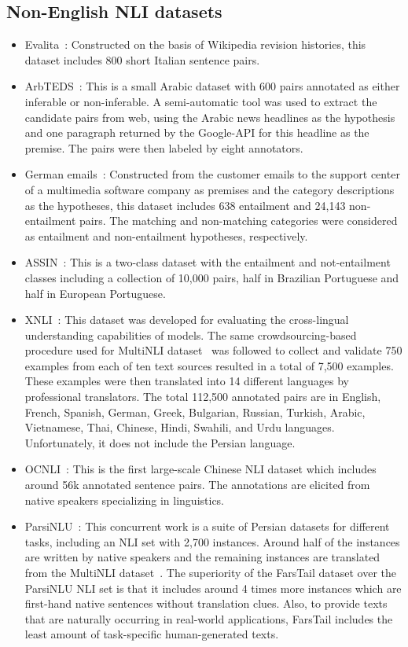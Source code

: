 \documentclass[preprint,12pt]{elsarticle}
\begin{document}
\subsection{Non-English NLI datasets}
\begin{itemize}
    \item Evalita~\citep{bos2009textual}: Constructed on the basis of Wikipedia revision histories, this dataset includes 800 short Italian sentence pairs.
    \item ArbTEDS~\citep{alabbas2013dataset}: This is a small Arabic dataset with 600 pairs annotated as either inferable or non-inferable. A semi-automatic tool was used to extract the candidate pairs from web, using the Arabic news headlines as the hypothesis and one paragraph returned by the Google-API for this headline as the premise. The pairs were then labeled by eight annotators. 
    \item German emails~\citep{eichler2014analysis}:  Constructed from the customer emails to the support center of a multimedia software company as premises and the category descriptions as the hypotheses, this dataset includes 638 entailment and 24,143 non-entailment pairs.  The matching and non-matching categories were considered as entailment and non-entailment hypotheses, respectively. 
    \item ASSIN~\citep{fonseca2016overview}: This is a two-class dataset with the entailment and not-entailment classes including a collection of 10,000 pairs, half in Brazilian Portuguese and half in European Portuguese. 
    \item XNLI~\citep{conneau2018xnli}: This dataset was developed for evaluating the cross-lingual understanding capabilities of models. The same crowdsourcing-based procedure used for MultiNLI dataset~\citep{williams2017broad} was followed to collect and validate 750 examples from each of ten text sources resulted in a total of 7,500 examples. These examples were then translated into 14 different languages by professional translators. The total 112,500 annotated pairs are in English, French, Spanish, German, Greek, Bulgarian, Russian, Turkish, Arabic, Vietnamese, Thai, Chinese, Hindi, Swahili, and Urdu languages. Unfortunately, it does not include the Persian language. \item OCNLI~\citep{hu2020ocnli}: This is the first large-scale Chinese NLI dataset which includes around 56k annotated sentence pairs. The annotations are elicited from native speakers specializing in linguistics.
    \item ParsiNLU~\citep{khashabi2020parsinlu}: This concurrent work is a suite of Persian datasets for different tasks, including an NLI set with 2,700 instances. Around half of the instances are written by native speakers and the remaining instances are translated from the MultiNLI dataset~\citep{williams2017broad}. The superiority of the FarsTail dataset over the ParsiNLU NLI set is that it includes around 4 times more instances which are first-hand native sentences without translation clues. Also, to provide texts that are naturally occurring in real-world applications, FarsTail includes the least amount of task-specific human-generated texts.
\end{itemize}
\end{document}
